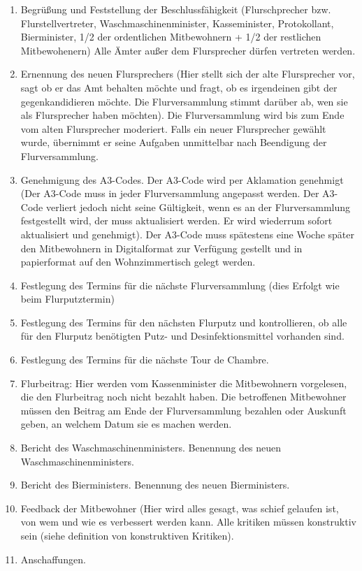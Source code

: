 \documentclass[10pt,a4paper,final]{article}
\begin{document}
\begin{enumerate}
\item Begrüßung und Feststellung der Beschlussfähigkeit (Flurschprecher bzw. Flurstellvertreter, Waschmaschinenminister, Kasseminister, Protokollant, Bierminister, 1/2 der ordentlichen Mitbewohnern + 1/2 der restlichen Mitbewohenern) Alle Ämter außer dem Flursprecher dürfen vertreten werden.
\item Ernennung des neuen Flursprechers (Hier stellt sich der alte Flursprecher vor, sagt ob er das Amt behalten möchte und fragt, ob es irgendeinen gibt der gegenkandidieren möchte. Die Flurversammlung stimmt darüber ab, wen sie als Flursprecher haben möchten). Die Flurversammlung wird bis zum Ende vom alten Flursprecher moderiert. Falls ein neuer Flursprecher gewählt wurde, übernimmt er seine Aufgaben unmittelbar nach Beendigung der Flurversammlung.
\item Genehmigung des A3-Codes. Der A3-Code wird per Aklamation genehmigt (Der A3-Code muss in jeder Flurversammlung angepasst werden. Der A3-Code verliert jedoch nicht seine Gültigkeit, wenn es an der Flurversammlung festgestellt wird, der muss aktualisiert werden. Er wird wiederrum sofort aktualisiert und genehmigt). Der A3-Code muss spätestens eine Woche später den Mitbewohnern in Digitalformat zur Verfügung gestellt  und in papierformat auf den Wohnzimmertisch gelegt werden.
\item Festlegung des Termins für die nächste Flurversammlung (dies Erfolgt wie beim Flurputztermin)
\item Festlegung des Termins für den nächsten Flurputz und kontrollieren, ob alle für den Flurputz benötigten Putz- und Desinfektionsmittel vorhanden sind.
\item Festlegung des Termins für die nächste Tour de Chambre.
\item Flurbeitrag: Hier werden vom Kassenminister die Mitbewohnern vorgelesen, die den Flurbeitrag noch nicht bezahlt haben. Die betroffenen Mitbewohner müssen den Beitrag am Ende der Flurversammlung bezahlen oder Auskunft geben, an welchem Datum sie es machen werden.
\item Bericht des Waschmaschinenministers. Benennung des neuen Waschmaschinenministers.
\item Bericht des Bierministers. Benennung des neuen Bierministers.
\item Feedback der Mitbewohner (Hier wird alles gesagt, was schief gelaufen ist, von wem und wie es verbessert werden kann. Alle kritiken müssen konstruktiv sein (siehe definition von konstruktiven Kritiken).
\item Anschaffungen. 


\end{enumerate}
\end{document}
